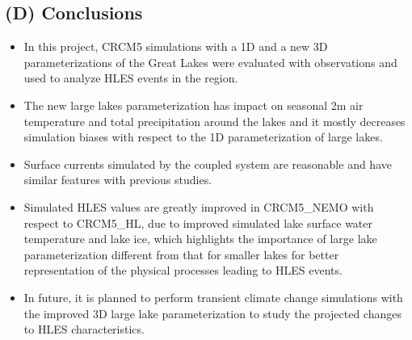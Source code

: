 \documentclass[a0b,landscape]{a0poster}
\begin{document}
\begin{multicols*}{4}
{
  \color{SaddleBrown} %

  \section*{(D) Conclusions}

  \begin{itemize}
  \item In this project, CRCM5 simulations with a 1D and a new 3D parameterizations of the Great Lakes were evaluated with observations and used to analyze HLES events in the region.
  \item The new large lakes parameterization has impact on seasonal 2m air temperature and total precipitation
        around the lakes and it mostly decreases simulation biases with respect to the
        1D parameterization of large lakes.
  \item Surface currents simulated by the coupled system are reasonable and have similar features with previous studies.
  \item Simulated HLES values are greatly improved in CRCM5\_NEMO with respect to
        CRCM5\_HL, due to improved simulated lake surface water temperature and lake
        ice, which highlights the importance of large lake parameterization different
        from that for smaller lakes for better representation of the physical processes
        leading to HLES events.
  \item In future, it is planned to perform transient climate change simulations with
        the improved 3D large lake parameterization to study the projected changes to
        HLES characteristics.
  \end{itemize}
}

\footnotesize
%

\end{multicols*}
\end{document}

